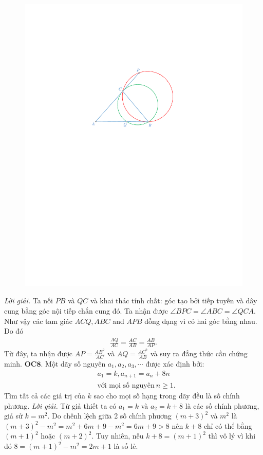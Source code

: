 \begin{multicols}{2}
\begin{figure}[H]
		\includegraphics[width=0.8\linewidth]{OC7}
		\vspace*{-5pt}
	\end{figure}
	\textit{Lời giải.} Ta nối $PB$ và $QC$ và khai thác tính chất: góc tạo bởi tiếp tuyến và dây cung bằng  góc nội tiếp chắn cung đó. Ta nhận được $ \angle BPC = \angle ABC = \angle QCA.$
	\vskip 0.1cm
	Như vậy các tam giác $ACQ, ABC$ and $APB$ đồng dạng vì có hai góc bằng nhau. Do đó
	\begin{align*}
		\frac{AQ}{AC}=\frac{AC}{AB}=\frac{AB}{AP}.
	\end{align*}
	Từ đây, ta nhận được $AP=\frac{AB^2}{AC}$
	và $AQ=\frac{AC^2}{AB}$ và suy ra đẳng thức cần chứng minh. 
	\vskip 0.1cm
	{\bf\color{cackithi} OC$\pmb{8.}$} Một dãy số nguyên $a_1, a_2, a_3, \cdots$ được xác định bởi: 
	\begin{align*}
		&a_1 = k, a_{n + 1} = a_n +8n \\
		 &\text{với mọi số nguyên}\ n \ge 1.
	\end{align*}
	Tìm tất cả các giá trị của $k$ sao cho mọi số hạng trong dãy đều là số chính phương.
	\vskip 0.1cm
	\textit{Lời giải.} 
	Từ giả thiết ta có $a_1=k$ và $a_2=k+8$ là các số chính phương, giả sử $k=m^2$. Do chênh lệch giữa 2 số chính phương $(m+3)^2$ và $m^2$ là $(m+3)^2-m^2= m^2+6m+9-m^2=6m+9>8$ nên $k+8$ chỉ có thể bằng $(m+1)^2$ hoặc $(m+2)^2$. Tuy nhiên, nếu $k+8=(m+1)^2$ thì vô lý vì khi đó $8=(m+1)^2-m^2=2m+1$ là số lẻ. 

\end{multicols}
